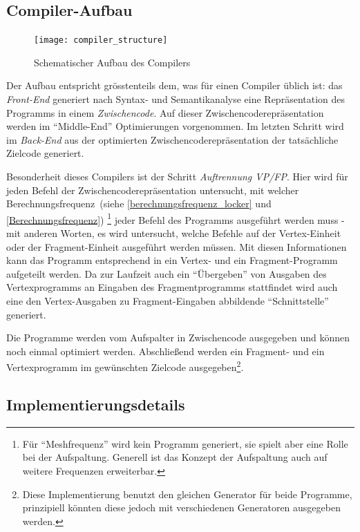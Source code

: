 \documentclass[twoside,a4paper,fleqn,12pt]{article}
\begin{document}
\subsection{Compiler-Aufbau}
\begin{figure}[h]
   \centering
  \texttt{[image: compiler\_structure]}
  \caption{Schematischer Aufbau des Compilers}
  \label{fig:structure}
\end{figure}

Der Aufbau entspricht grösstenteils dem, was für einen Compiler üblich ist: das \emph{Front-End} generiert nach Syntax- und Semantikanalyse
eine Repräsentation des Programms in einem \emph{Zwischencode}. Auf dieser Zwischencoderepräsentation werden im "`Middle-End"' %
Optimierungen vorgenommen. Im letzten Schritt wird im \emph{Back-End} aus der optimierten Zwischencoderepräsentation der tatsächliche Zielcode generiert.

Besonderheit dieses Compilers ist der Schritt \emph{Auftrennung VP/FP}. Hier wird für jeden Befehl der Zwischencoderepräsentation untersucht, mit
welcher Berechnungsfrequenz~(siehe \ref{berechnungsfrequenz_locker} und \ref{Berechnungsfrequenz})
\footnote{Für "`Meshfrequenz"' wird kein Programm generiert, sie spielt aber eine Rolle bei der Aufspaltung. Generell ist das Konzept der Aufspaltung auch auf weitere Frequenzen erweiterbar.}
jeder Befehl des Programms ausgeführt werden muss - mit anderen Worten,
es wird untersucht, welche Befehle auf der Vertex-Einheit oder der Fragment-Einheit ausgeführt werden müssen. Mit diesen Informationen kann
das Programm entsprechend in ein Vertex- und ein Fragment-Programm aufgeteilt werden. Da zur Laufzeit auch ein "`Übergeben"' von Ausgaben
des Vertexprogramms an Eingaben des Fragmentprogramms stattfindet wird auch eine den Vertex-Ausgaben zu Fragment-Eingaben
abbildende "`Schnittstelle"' generiert.

Die Programme werden vom Aufspalter in Zwischencode ausgegeben und können noch einmal optimiert werden. %
Abschließend werden ein Fragment- und ein Vertexprogramm im gewünschten Zielcode ausgegeben\footnote{Diese Implementierung benutzt den
gleichen Generator für beide Programme, prinzipiell könnten diese jedoch mit verschiedenen Generatoren ausgegeben werden.}.

\subsection{Implementierungsdetails}
\end{document}
